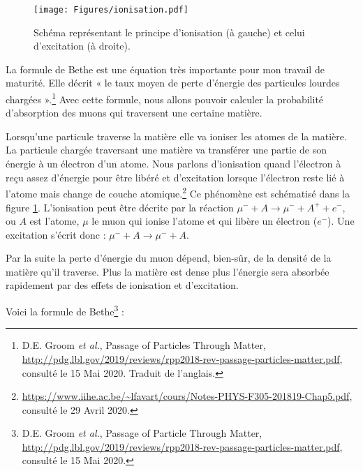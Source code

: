 \documentclass[a4paper, 12pt]{article}
\begin{document}
\begin{spacing}{1.5}
\begin{figure}[t]
\begin{center}
\texttt{[image: Figures/ionisation.pdf]}
\caption{\label{fig:ionisation} Schéma représentant le principe d'ionisation (à gauche) et celui d'excitation (à droite).}
\end{center}
\end{figure}
La formule de Bethe est une équation très importante pour mon travail de maturité. Elle décrit « le taux moyen de perte d'énergie des particules lourdes chargées ».\footnote{D.E. Groom \emph{et al.}, Passage of Particles Through Matter, \url{http://pdg.lbl.gov/2019/reviews/rpp2018-rev-passage-particles-matter.pdf}, consulté le 15 Mai 2020. Traduit de l'anglais.} Avec cette formule, nous allons pouvoir calculer la probabilité d'absorption des muons qui traversent une certaine matière.

Lorsqu'une particule traverse la matière elle va ioniser les atomes de la matière. La particule chargée traversant une matière va transférer une partie de son énergie à un électron d'un atome. Nous parlons d'ionisation quand l'électron à reçu assez d'énergie pour être libéré et d'excitation lorsque l'électron reste lié à l'atome mais change de couche atomique.\footnote{\url{https://www.iihe.ac.be/~lfavart/cours/Notes-PHYS-F305-201819-Chap5.pdf}, consulté le 29 Avril 2020.} Ce phénomène est schématisé dans la figure \ref{fig:ionisation}. L'ionisation peut être décrite par la réaction $\mu^- + A \rightarrow \mu^- + A^+ + e^- $, ou $A$ est l'atome, $\mu$ le muon qui ionise l'atome et qui libère un électron ($e^-$). Une excitation s'écrit donc : $\mu^- + A \rightarrow \mu^- + A$.


Par la suite la perte d'énergie du muon dépend, bien-sûr, de la densité de la matière qu'il traverse. Plus la matière est dense plus l'énergie sera absorbée rapidement par des effets de ionisation et d'excitation. 

Voici la formule de Bethe\footnote{D.E. Groom \emph{et al.}, Passage of Particle Through Matter, \url{http://pdg.lbl.gov/2019/reviews/rpp2018-rev-passage-particles-matter.pdf}, consulté le 15 Mai 2020.} : 


\end{spacing}
\end{document}
